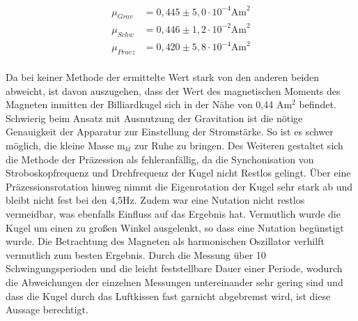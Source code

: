 \begin{align*}
 \mu_{Grav} &= 0,445 \pm 5,0 \cdot 10^{-4} \text{Am}^2\\
 \mu_{Schw} &= 0,446 \pm 1,2 \cdot 10^{-2} \text{Am}^2\\
 \mu_{Praez} &= 0,420 \pm 5,8 \cdot 10^{-4} \text{Am}^2\\
\end{align*}

Da bei keiner Methode der ermittelte Wert stark von den anderen beiden abweicht, ist davon auszugehen, dass der Wert des magnetischen 
Moments des Magneten inmitten der Billiardkugel sich in der Nähe von 0,44 Am$^2$ befindet. Schwierig beim Ansatz mit Ausnutzung der
Gravitation ist die nötige Genauigkeit der Apparatur zur Einstellung der Stromstärke. So ist es schwer möglich, die kleine Masse m$_{kl}$
zur Ruhe zu bringen. Des Weiteren gestaltet sich die Methode der Präzession als fehleranfällig, da die Synchonisation von Stroboskopfrequenz
und Drehfrequenz der Kugel nicht Restlos gelingt. Über eine Präzessionsrotation hinweg nimmt die Eigenrotation der Kugel sehr stark ab und bleibt nicht fest bei den 4,5Hz. Zudem war eine Nutation nicht restlos vermeidbar, was ebenfalls Einfluss auf das Ergebnis hat. 
Vermutlich wurde die Kugel um einen zu großen Winkel ausgelenkt, so dass eine Nutation begünstigt wurde. Die Betrachtung des Magneten als
harmonischen Oszillator verhilft vermutlich zum besten Ergebnis. Durch die Messung über 10 Schwingungsperioden und die leicht feststellbare Dauer
einer Periode, wodurch die Abweichungen der einzelnen Messungen untereinander sehr gering sind und dass die Kugel durch das Luftkissen fast garnicht abgebremst wird,
 ist diese Aussage berechtigt.






